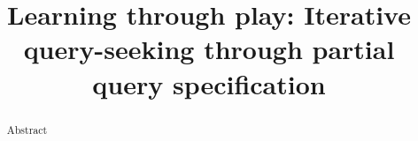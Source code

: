 \documentclass{sig-alternate-05-2015}
\begin{document}



%

\title{Learning through play: Iterative query-seeking through partial query specification}
%
%
%
%
%

%
\maketitle
\begin{abstract}
Abstract
\end{abstract}


\end{document}
